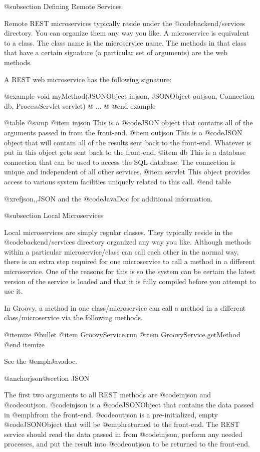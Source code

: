 @subsection Defining Remote Services

Remote REST microservices typically reside under the
@code{backend/services} directory.  You can organize them any way you
like.  A microservice is equivalent to a class.  The class name is the
microservice name.  The methods in that class that have a certain
signature (a particular set of arguments) are the web methods.

A REST web microservice has the following signature:

@example
void myMethod(JSONObject injson, 
              JSONObject outjson, 
              Connection db, 
              ProcessServlet servlet) @{
...
@}
@end example

@table @samp
@item injson
This is a @code{JSON} object that contains all of the arguments passed
in from the front-end.
@item outjson
This is a @code{JSON} object that will contain all of the results
sent back to the front-end.  Whatever is put in this object gets sent back to the front-end.
@item db
This is a database connection that can be used to access the SQL database.  The
connection is unique and independent of all other services.
@item servlet
This object provides access to various system facilities uniquely related
to this call.
@end table

@xref{json,,JSON} and the @code{JavaDoc} for additional information.


@subsection Local Microservices

Local microservices are simply regular classes.  They typically reside
in the @code{backend/services} directory organized any way you like.
Although methods within a particular microservice/class can call each
other in the normal way, there is an extra step required for one
microservice to call a method in a different microservice.  One of the
reasons for this is so the system can be certain the latest version of
the service is loaded and that it is fully compiled before you attempt
to use it.

In Groovy, a method in one class/microservice can call a method
in a different class/microservice via the following methods.

@itemize @bullet
@item
GroovyService.run
@item
GroovyService.getMethod
@end itemize

See the @emph{Javadoc}.

@anchor{json}@section JSON

The first two arguments to all REST methods are @code{injson} and
@code{outjson}.  @code{injson} is a @code{JSONObject} that contains
the data passed in @emph{from} the front-end.  @code{outjson} is a
pre-initialized, empty @code{JSONObject} that will be @emph{returned
to} the front-end.  The REST service should read the data passed in
from @code{injson}, perform any needed processes, and put the result
into @code{outjson} to be returned to the front-end.

